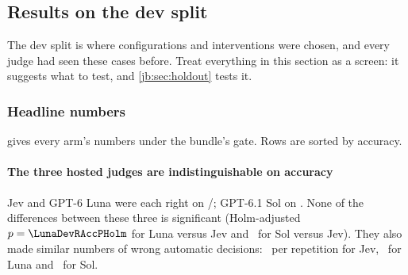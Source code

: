 \subsection{Results on the dev split \texorpdfstring{\screen}{[screen]}}\label{jb:sec:dev}

The dev split is where configurations and interventions were chosen, and every judge had seen these
cases before. Treat everything in this section as a screen: it suggests what to test, and
\cref{jb:sec:holdout} tests it.

\subsubsection{Headline numbers}

 gives every arm's numbers under the bundle's gate. Rows are sorted by accuracy.

\begin{table}[tbp]
\centering\small
\caption{Dev split \screen, \DevN\ cases, \DevReps\ repetitions, policy .
Accuracy, wrong-automatic count and coverage are per-case majorities over the repetitions; intervals are
95\,\% Wilson. Latency pools every valid request. ``+ I1'' marks the arms with the side-effect clause
added to their instruction.}
\label{jb:tab:headline-dev}

\end{table}

\paragraph{The three hosted judges are indistinguishable on accuracy} Jev and GPT-6 Luna were each
right on \JevDevAccK/\DevN; GPT-6.1 Sol on \SolDevAccK. None of the differences between these three is
significant (Holm-adjusted $p = \LunaDevRAccPHolm$ for Luna versus Jev and \SolDevRAccPHolm\ for Sol
versus Jev). They also made similar numbers of wrong automatic decisions: \JevDevWaRange\ per repetition
for Jev, \LunaDevWaRange\ for Luna and \SolDevWaRange\ for Sol.

